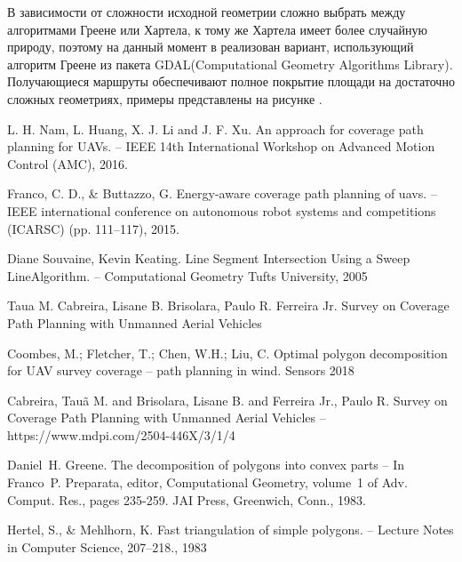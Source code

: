 
В зависимости от сложности исходной геометрии сложно выбрать между алгоритмами Греене или Хартела, к тому же Хартела имеет более случайную природу, поэтому на данный момент в реализован вариант, использующий алгоритм Греене из пакета GDAL(Computational Geometry Algorithms Library). Получающиеся маршруты обеспечивают полное покрытие площади на достаточно сложных геометриях, примеры представлены на рисунке .



\begin{thebibliography}{99}
	
	
	\re{} L. H. Nam, L. Huang, X. J. Li and J. F. Xu. An approach for coverage path planning for UAVs. -- IEEE 14th International Workshop on Advanced Motion Control (AMC), 2016.
	
	\re{} Franco, C. D., \& Buttazzo, G. Energy-aware coverage path planning of uavs. -- IEEE international conference on autonomous robot systems and competitions
	(ICARSC) (pp. 111–117), 2015.
	
	\re{} Diane Souvaine, Kevin Keating. Line Segment Intersection Using a Sweep LineAlgorithm. -- Computational Geometry Tufts University, 2005
	
	\re{} Taua M. Cabreira, Lisane B. Brisolara, Paulo R. Ferreira Jr. Survey on Coverage Path Planning with Unmanned Aerial Vehicles 
	
	\re{} Coombes, M.; Fletcher, T.; Chen, W.H.; Liu, C. Optimal polygon decomposition for UAV survey coverage -- path planning in wind. Sensors 2018
	
	\re{} Cabreira, Tauã M. and Brisolara, Lisane B. and Ferreira Jr., Paulo R. Survey on Coverage Path Planning with Unmanned Aerial Vehicles -- https://www.mdpi.com/2504-446X/3/1/4
	
	\re{} Daniel H. Greene. The decomposition of polygons into convex parts -- In Franco P. Preparata, editor, Computational Geometry, volume 1 of Adv. Comput. Res., pages 235-259. JAI Press, Greenwich, Conn., 1983.
	
	\re{} Hertel, S., \& Mehlhorn, K. Fast triangulation of simple polygons. -- Lecture Notes in Computer Science, 207–218., 1983
	
\end{thebibliography}

